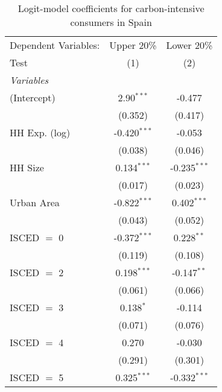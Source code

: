 
\begin{table}[htbp!]
   \centering
   \small
   \begin{adjustbox}{width = 1\textwidth, max height = 0.95\textheight, center}
      \begin{threeparttable}[b]
         \caption{\label{tab:Logit_1_ESP} Logit-model coefficients for carbon-intensive consumers in Spain}
         \begin{tabular}{lcc}
            \tabularnewline \midrule \midrule
            Dependent Variables: & Upper 20\%     & Lower 20\%\\   
            Test                 & (1)            & (2)\\  
            \midrule
            \emph{Variables}\\
            (Intercept)          & 2.90$^{***}$   & -0.477\\   
                                 & (0.352)        & (0.417)\\   
            HH Exp. (log)        & -0.420$^{***}$ & -0.053\\   
                                 & (0.038)        & (0.046)\\   
            HH Size              & 0.134$^{***}$  & -0.235$^{***}$\\   
                                 & (0.017)        & (0.023)\\   
            Urban Area           & -0.822$^{***}$ & 0.402$^{***}$\\   
                                 & (0.043)        & (0.052)\\   
            ISCED $=$ 0          & -0.372$^{***}$ & 0.228$^{**}$\\   
                                 & (0.119)        & (0.108)\\   
            ISCED $=$ 2          & 0.198$^{***}$  & -0.147$^{**}$\\   
                                 & (0.061)        & (0.066)\\   
            ISCED $=$ 3          & 0.138$^{*}$    & -0.114\\   
                                 & (0.071)        & (0.076)\\   
            ISCED $=$ 4          & 0.270          & -0.030\\   
                                 & (0.291)        & (0.301)\\   
            ISCED $=$ 5          & 0.325$^{***}$  & -0.332$^{***}$\\   

\end{tabular}
\end{threeparttable}
\end{adjustbox}
\end{table}
